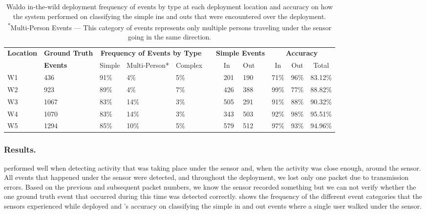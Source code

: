 \begin{table}[t]
	\footnotesize
		\begin{tabular}{@{}p{0.9in}p{0.8in}lllp{0.12in}p{0.2in}llp{0.2in}ccc@{}}
		\toprule
		\multirow{2}{*}{\textbf{Location}} & \textbf{Ground Truth} & \multicolumn{3}{c}{\textbf{Frequency of Events by Type}} & &\multicolumn{4}{c}{\textbf{Simple Events}} & \multicolumn{3}{c}{\textbf{Accuracy}} \\
	 & \textbf{Events} & Simple & Multi-Person*   & Complex   & &  & In  & Out  &  & In        & Out      & Total        \\  
	\midrule
	W1   & 436   & 91\%   & 4\%    & 5\%  & & & 201   & 190  &  & 71\%   & 96\%    & 83.12\%                   \\ %
	W2   & 923   & 89\%   & 4\%    & 7\%  & & & 426   & 388  &  & 99\%   & 77\%    & 88.82\%                   \\ %
	W3   & 1067  & 83\%   & 14\%   & 3\%  & & & 505   & 291  &  & 91\%   & 88\%    & 90.32\%                   \\ %
	W4   & 1070  & 83\%   & 14\%   & 3\%  & & & 343   & 503  &  & 92\%   & 98\%    & 95.51\%                   \\ %
	W5   & 1294  & 85\%   & 10\%   & 5\%  & & & 579   & 512  &  & 97\%   & 93\%    & 94.96\%                   \\ %
		\bottomrule
		\end{tabular}
		\caption{Waldo in-the-wild deployment frequency of events by type at each deployment location and accuracy on how the system performed on classifying the simple ins and outs that were encountered over the deployment.
		\vspace{1mm}
		\\\textsuperscript{*}Multi-Person Events --- This category of events represents only multiple persons traveling under the sensor going in the same direction.
		\label{tab:ITWresults}}
	
	\end{table}
	


\subsubsection{Results.}  
\sysname performed well when detecting activity that was taking place under the sensor and, when the activity was close enough, around the sensor.
All events that happened under the sensor were detected, and throughout the deployment, we lost only one packet due to transmission errors. 
Based on the previous and subsequent packet numbers, we know the sensor recorded something but we can not verify whether the one ground truth event that occurred during this time was detected correctly.
 shows the frequency of the different event categories that the sensors experienced while deployed and \sysname's accuracy on classifying the simple in and out events where a single user walked under the sensor.

